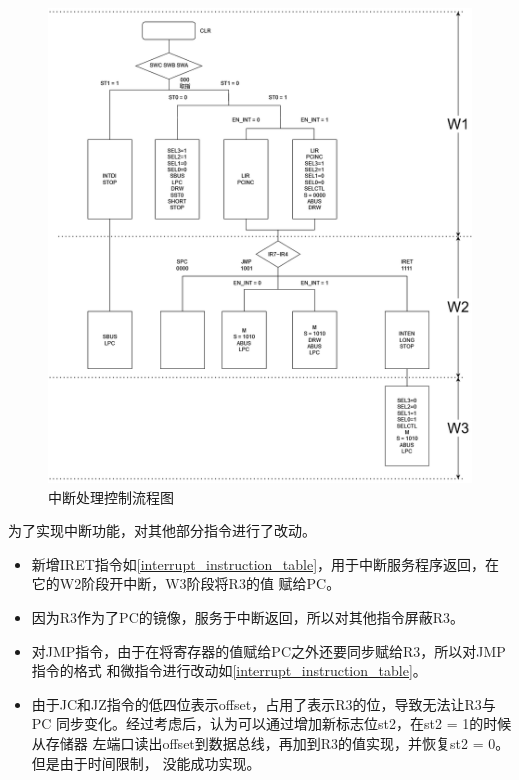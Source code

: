 \begin{figure}[h]
    \centering
    \label{interrupt_control_flow}
    \includegraphics[width=\textwidth]{figures/chapter3/interrupt_control_flow.drawio.png}
    \caption{中断处理控制流程图}
\end{figure}
为了实现中断功能，对其他部分指令进行了改动。
\begin{itemize}
    \item 新增IRET指令如\ref{interrupt_instruction_table}，用于中断服务程序返回，在它的W2阶段开中断，W3阶段将R3的值
          赋给PC。
    \item 因为R3作为了PC的镜像，服务于中断返回，所以对其他指令屏蔽R3。
    \item 对JMP指令，由于在将寄存器的值赋给PC之外还要同步赋给R3，所以对JMP指令的格式
          和微指令进行改动如\ref{interrupt_instruction_table}。
    \item 由于JC和JZ指令的低四位表示offset，占用了表示R3的位，导致无法让R3与PC
          同步变化。经过考虑后，认为可以通过增加新标志位st2，在st2 = 1的时候从存储器
          左端口读出offset到数据总线，再加到R3的值实现，并恢复st2 = 0。但是由于时间限制，
          没能成功实现。
\end{itemize}
